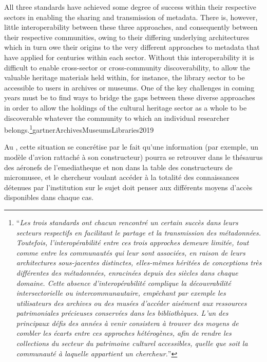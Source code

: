 \begin{myquote}
	{All three standards have achieved some degree of success within their respective sectors in enabling the sharing and transmission of metadata. There is, however, little interoperability between these three approaches, and consequently between their respective communities, owing to their differing underlying architectures which in turn owe their origins to the very different approaches to metadata that have applied for centuries within each sector. Without this interoperability it is difficult to enable cross-sector or cross-community discoverability, to allow the valuable heritage materials held within, for instance, the library sector to be accessible to users in archives or museums. One of the key challenges in coming years must be to find ways to bridge the gaps between these diverse approaches in order to allow the holdings of the cultural heritage sector as a whole to be discoverable whatever the community to which an individual researcher belongs.\footnote{\enquote{\textit{Les trois standards ont chacun rencontré un certain succès dans leurs secteurs respectifs en facilitant le partage et la transmission des métadonnées. Toutefois, l’interopérabilité entre ces trois approches demeure limitée, tout comme entre les communautés qui leur sont associées, en raison de leurs architectures sous-jacentes distinctes, elles-mêmes héritées de conceptions très différentes des métadonnées, enracinées depuis des siècles dans chaque domaine. Cette absence d’interopérabilité complique la découvrabilité intersectorielle ou intercommunautaire, empêchant par exemple les utilisateurs des archives ou des musées d’accéder aisément aux ressources patrimoniales précieuses conservées dans les bibliothèques. L’un des principaux défis des années à venir consistera à trouver des moyens de combler les écarts entre ces approches hétérogènes, afin de rendre les collections du secteur du patrimoine culturel accessibles, quelle que soit la communauté à laquelle appartient un chercheur.}}}}{gartnerArchivesMuseumsLibraries2019}
\end{myquote}

Au \mae, cette situation se concrétise par le fait qu’une information (par exemple, un modèle d’avion rattaché à son constructeur) pourra se retrouver dans le thésaurus des aéronefs de l’\gls{emediatheque} et non dans la table des constructeurs de \gls{micromusee}, et le chercheur voulant accéder à la totalité des connaissances détenues par l’institution sur le sujet doit penser aux différents moyens d’accès disponibles dans chaque cas.

